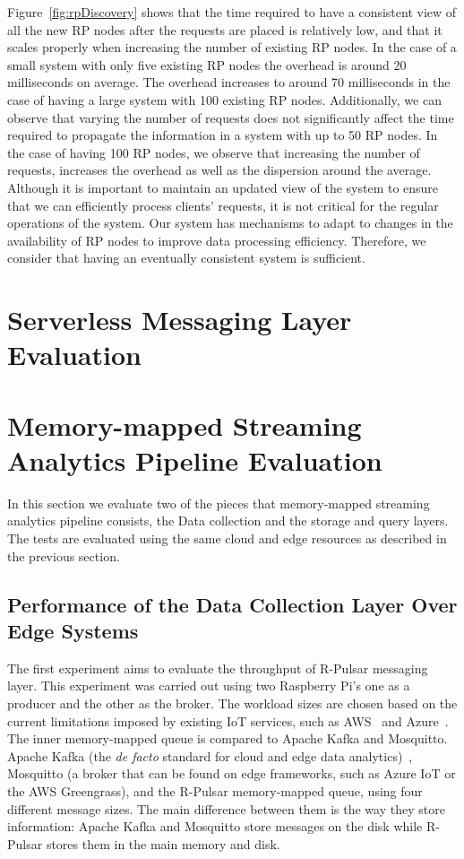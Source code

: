 Figure~\ref{fig:rpDiscovery} shows that the time required to have a consistent view of all the new RP nodes after the requests are placed is relatively low, and that it scales properly when increasing the number of existing RP nodes. In the case of a small system with only five existing RP nodes the overhead is around 20 milliseconds on average. The overhead increases to around 70 milliseconds in the case of having a large system with 100 existing RP nodes. Additionally, we can observe that varying the number of requests does not significantly affect the time required to propagate the information in a system with up to 50 RP nodes. In the case of having 100 RP nodes, we observe that increasing the number of requests, increases the overhead as well as the dispersion around the average. Although it is important to maintain an updated view of the system to ensure that we can efficiently process clients' requests, it is not critical for the regular operations of the system. Our system has mechanisms to adapt to changes in the availability of RP nodes to improve data processing efficiency. Therefore, we consider that having an eventually consistent system is sufficient. 



\section{Serverless Messaging Layer Evaluation}

\section{Memory-mapped Streaming Analytics Pipeline Evaluation}

In this section we evaluate two of the pieces that memory-mapped streaming analytics pipeline consists, the Data collection and the storage and query layers. The tests are evaluated using the same cloud and edge resources as described in the previous section.

\subsection{Performance of the Data Collection Layer Over Edge Systems}

The first experiment aims to evaluate the throughput of R-Pulsar messaging layer. This experiment was carried out using two Raspberry Pi's one as a producer and the other as the broker. The workload sizes are chosen based on the current limitations imposed by existing IoT services, such as AWS~\cite{AWS-MQTT} and Azure~\cite{AZURE-MQTT}. The inner memory-mapped queue is compared to Apache Kafka and Mosquitto. Apache Kafka (the \textit{de facto} standard for cloud and edge data analytics)~\cite{Young2017, firework, planner}, Mosquitto (a broker that can be found on edge frameworks, such as Azure IoT or the AWS Greengrass), and the R-Pulsar memory-mapped queue, using four different message sizes.  The main difference between them is the way they store information: Apache Kafka and Mosquitto store messages on the disk while R-Pulsar stores them in the main memory and disk. 

